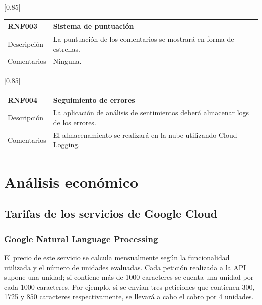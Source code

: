 \begin{table}[!htbp]
  \centering
  \scalebox{0.85}[0.85] {
    \begin{tabular}{l p{32.145em}}
    \toprule
    \textbf{RNF003} & \textbf{Sistema de puntuación} \\
    \midrule
    Descripción & La puntuación de los comentarios se mostrará en forma de estrellas. \\
    Comentarios & Ninguna. \\
    \midrule
    \end{tabular}%
  }
  \label{tab:rnf003}
\end{table}%

\begin{table}[!htbp]
  \centering
  \scalebox{0.85}[0.85] {
    \begin{tabular}{l p{32.145em}}
    \toprule
    \textbf{RNF004} & \textbf{Seguimiento de errores} \\
    \midrule
    Descripción & La aplicación de análisis de sentimientos deberá almacenar logs de los errores. \\
    Comentarios & El almacenamiento se realizará en la nube utilizando Cloud Logging. \\
    \midrule
    \end{tabular}%
  }
  \label{tab:rnf004}
\end{table}%

\section{Análisis económico}

\subsection{Tarifas de los servicios de Google Cloud}

\subsubsection{Google Natural Language Processing}

El precio de este servicio se calcula mensualmente según la funcionalidad utilizada y el número de unidades evaluadas. Cada petición realizada a la API supone una unidad; si contiene más de 1000 caracteres se cuenta una unidad por cada 1000 caracteres. Por ejemplo, si se envían tres peticiones que contienen 300, 1725 y 850 caracteres respectivamente, se llevará a cabo el cobro por 4 unidades.

